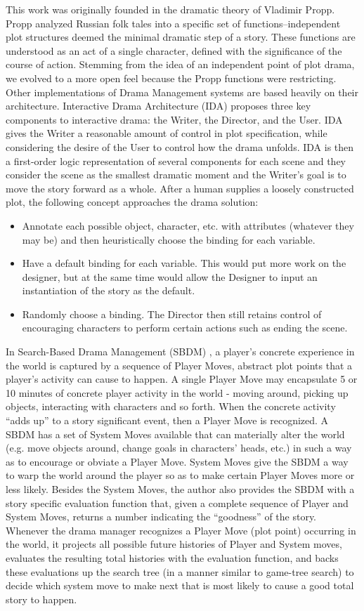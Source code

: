 \documentclass[journal]{./IEEEtran}
\begin{document}
This work was originally founded in the dramatic theory of Vladimir Propp. \cite{Propp68} Propp analyzed Russian folk tales into a specific set of functions--independent plot structures deemed the minimal dramatic step of a story. These functions are understood as an act of a single character, defined with the significance of the course of action. Stemming from the idea of an independent point of plot drama, we evolved to a more open feel because the Propp functions were restricting. Other implementations of Drama Management systems are based heavily on their architecture. 
Interactive Drama Architecture (IDA) \cite{diageng} proposes three key components to interactive drama: the Writer, the Director, and the User. IDA gives the Writer a reasonable amount of control in plot specification, while considering the desire of the User to control how the drama unfolds. IDA is then a first-order logic representation of several components for each scene and they consider the scene as the smallest dramatic moment and the Writer’s goal is to move the story forward as a whole. After a human supplies a loosely constructed plot, the following concept approaches the drama solution:
\begin{itemize} 
\item Annotate each possible object, character, etc. with attributes (whatever they may be) and then heuristically choose the binding for each variable.
\item Have a default binding for each variable. This would put more work on the designer, but at the same time would allow the Designer to input an instantiation of the story as the default.
\item Randomly choose a binding. The Director then still retains control of encouraging characters to perform certain actions such as ending the scene.
\end{itemize}
In Search-Based Drama Management (SBDM) \cite{sbdm}, a player’s concrete experience in the world is captured by a sequence of Player Moves, abstract plot points that a player’s activity can cause to happen. A single Player Move may encapsulate 5 or 10 minutes of concrete player activity in the world - moving around, picking up objects, interacting with characters and so forth. When the concrete activity “adds up” to a story significant event, then a Player Move is recognized. A SBDM has a set of System Moves available that can materially alter the world (e.g. move objects around, change goals in characters’ heads, etc.) in such a way as to encourage or obviate a Player Move. System Moves give the SBDM a way to warp the world around the player so as to make certain Player Moves more or less likely. Besides the System Moves, the author also provides the SBDM with a story specific evaluation function that, given a complete sequence of Player and System Moves, returns a number indicating the “goodness” of the story. Whenever the drama manager recognizes a Player Move (plot point) occurring in the world, it projects all possible future histories of Player and System moves, evaluates the resulting total histories with the evaluation function, and backs these evaluations up the search tree (in a manner similar to game-tree search) to decide which system move to make next that is most likely to cause a good total story to happen.
\end{document}
